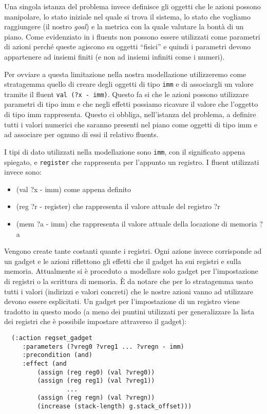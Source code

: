Una singola istanza del problema invece definisce gli oggetti che le
azioni possono manipolare, lo stato iniziale nel quale si trova il
sistema, lo stato che vogliamo raggiungere (il nostro \emph{goal}) e
la metrica con la quale valutare la bontà di un piano.  Come
evidenziato in \cite{fox-03} i fluents non possono essere utilizzati
come parametri di azioni perché queste agiscono su oggetti ``fisici''
e quindi i parametri devono appartenere ad insiemi finiti (e non ad
insiemi infiniti come i numeri). 

Per ovviare a questa limitazione nella nostra modellazione
utilizzeremo come stratagemma quello di creare degli oggetti di tipo
\lstinline{imm} e di associargli un valore tramite il fluent
\lstinline{val (?x - imm)}. Questo fa si che le azioni possono
utilizzare parametri di tipo imm e che negli effetti possiamo ricavare
il valore che l'oggetto di tipo imm rappresenta. Questo ci obbliga,
nell'istanza del problema, a definire tutti i valori numerici che
saranno presenti nel piano come oggetti di tipo imm e ad associare per
ognuno di essi il relativo fluents.

I tipi di dato utilizzati nella modellazione sono \lstinline{imm}, con
il significato appena spiegato, e \lstinline{register} che rappresenta
per l'appunto un registro. I fluent utilizzati invece sono:

\begin{itemize}
\item (val ?x - imm) come appena definito
\item (reg ?r - register) che rappresenta il valore attuale del
  registro ?r
\item (mem ?a - imm) che rappresenta il valore attuale della locazione
  di memoria ?a
\end{itemize}

Vengono create tante costanti quante i registri.  Ogni azione invece
corrisponde ad un gadget e le azioni riflettono gli effetti che il
gadget ha sui registri e sulla memoria.  Attualmente si è proceduto a
modellare solo gadget per l'impostazione di registri o la scrittura di
memoria. È da notare che per lo stratagemma usato tutti i valori
(indirizzi e valori concreti) che le nostre azioni vanno ad utilizzare
devono essere esplicitati. Un gadget per l'impostazione di un registro
viene tradotto in questo modo (a meno dei puntini utilizzati per
generalizzare la lista dei registri che è possibile impostare
attraverso il gadget):

\begin{lstlisting}
  (:action regset_gadget
	 :parameters (?vreg0 ?vreg1 ... ?vregn - imm)
	 :precondition (and)
	 :effect (and
	 	 (assign (reg reg0) (val ?vreg0))
	 	 (assign (reg reg1) (val ?vreg1))
                 ...
	 	 (assign (reg regn) (val ?vregn))
		 (increase (stack-length) g.stack_offset)))
\end{lstlisting}

